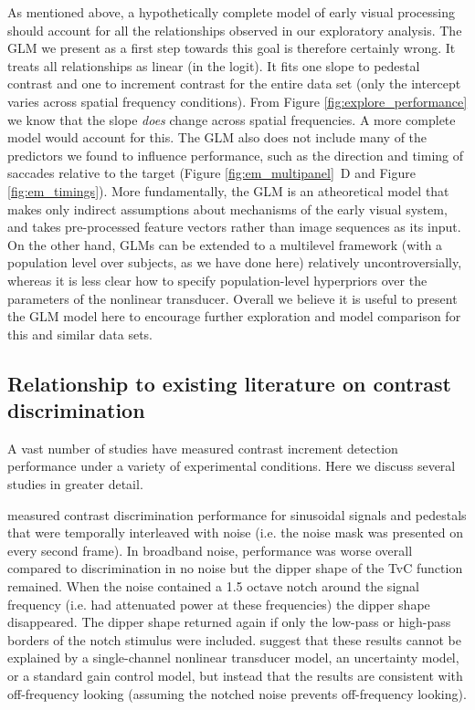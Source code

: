 \documentclass[11pt,a4paper]{article}
\begin{document}
{As mentioned above, a hypothetically complete model of early visual processing should account for all the relationships observed in our exploratory analysis.
The GLM we present as a first step towards this goal is therefore certainly wrong.
It treats all relationships as linear (in the logit).
It fits one slope to pedestal contrast and one to increment contrast for the entire data set (only the intercept varies across spatial frequency conditions).
From Figure \ref{fig:explore_performance} we know that the slope \textit{does} change across spatial frequencies.
A more complete model would account for this.
The GLM also does not include many of the predictors we found to influence performance, such as the direction and timing of saccades relative to the target (Figure \ref{fig:em_multipanel}~D and Figure \ref{fig:em_timings}).
More fundamentally, the GLM is an atheoretical model that makes only indirect assumptions about mechanisms of the early visual system, and takes pre-processed feature vectors rather than image sequences as its input.
On the other hand, GLMs can be extended to a multilevel framework (with a population level over subjects, as we have done here) relatively uncontroversially, whereas it is less clear how to specify population-level hyperpriors over the parameters of the nonlinear transducer.
Overall we believe it is useful to present the GLM model here to encourage further exploration and model comparison for this and similar data sets.


\subsection{Relationship to existing literature on contrast discrimination}

A vast number of studies have measured contrast increment detection performance under a variety of experimental conditions. 
Here we discuss several studies in greater detail.

\citet{Henning2007} measured contrast discrimination performance for sinusoidal signals and pedestals that were temporally interleaved with noise (i.e. the noise mask was presented on every second frame). 
In broadband noise, performance was worse overall compared to discrimination in no noise but the dipper shape of the TvC function remained. 
When the noise contained a 1.5 octave notch around the signal frequency (i.e. had attenuated power at these frequencies) the dipper shape disappeared.
The dipper shape returned again if only the low-pass or high-pass borders of the notch stimulus were included.
\citet{Henning2007} suggest that these results cannot be explained by a single-channel nonlinear transducer model, an uncertainty model, or a standard gain control model, but instead that the results are consistent with off-frequency looking (assuming the notched noise prevents off-frequency looking).

}
\end{document}
